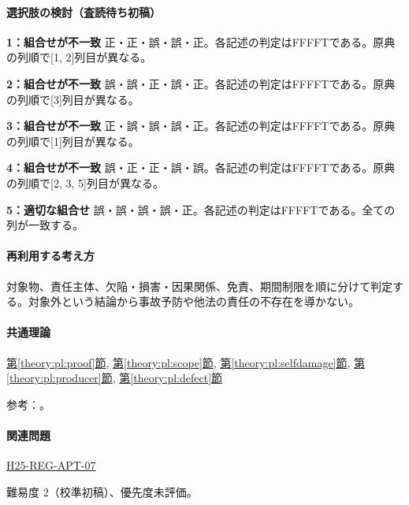 \paragraph{選択肢の検討（査読待ち初稿）}\mbox{}\par

\noindent\textbf{1：組合せが不一致} 正・正・誤・誤・正。各記述の判定はFFFFTである。原典の列順で[1, 2]列目が異なる。\par

\noindent\textbf{2：組合せが不一致} 誤・誤・正・誤・正。各記述の判定はFFFFTである。原典の列順で[3]列目が異なる。\par

\noindent\textbf{3：組合せが不一致} 正・誤・誤・誤・正。各記述の判定はFFFFTである。原典の列順で[1]列目が異なる。\par

\noindent\textbf{4：組合せが不一致} 誤・正・正・誤・誤。各記述の判定はFFFFTである。原典の列順で[2, 3, 5]列目が異なる。\par

\noindent\textbf{5：適切な組合せ} 誤・誤・誤・誤・正。各記述の判定はFFFFTである。全ての列が一致する。\par

\paragraph{再利用する考え方} 対象物、責任主体、欠陥・損害・因果関係、免責、期間制限を順に分けて判定する。対象外という結論から事故予防や他法の責任の不存在を導かない。

\paragraph{共通理論} \hyperref[theory:pl:proof]{第\ref*{theory:pl:proof}節}, \hyperref[theory:pl:scope]{第\ref*{theory:pl:scope}節}, \hyperref[theory:pl:selfdamage]{第\ref*{theory:pl:selfdamage}節}, \hyperref[theory:pl:producer]{第\ref*{theory:pl:producer}節}, \hyperref[theory:pl:defect]{第\ref*{theory:pl:defect}節}

\par 参考：\cite{pl_statute,pl_qa,pl_definitions2018}。

\paragraph{関連問題} \hyperref[q:h25-reg-apt-07]{H25-REG-APT-07}

\par 難易度 2（校準初稿）、優先度未評価。

